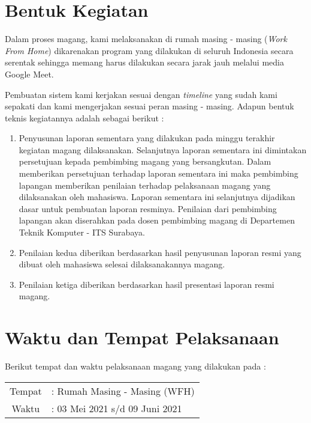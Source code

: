 \section{Bentuk Kegiatan}

Dalam proses magang, kami melaksanakan di rumah masing - masing (\textit{Work From Home}) dikarenakan program yang dilakukan di seluruh Indonesia secara serentak sehingga memang harus dilakukan secara jarak jauh melalui media Google Meet.

Pembuatan sistem kami kerjakan sesuai dengan \textit{timeline} yang sudah kami sepakati dan kami mengerjakan sesuai peran masing - masing. Adapun bentuk teknis kegiatannya adalah sebagai berikut :

\begin{enumerate}[nolistsep]
      \item Penyusunan laporan sementara yang dilakukan pada minggu terakhir kegiatan
            magang dilaksanakan. Selanjutnya laporan sementara ini dimintakan persetujuan
            kepada pembimbing magang yang bersangkutan. Dalam memberikan persetujuan
            terhadap laporan sementara ini maka pembimbing lapangan memberikan penilaian terhadap
            pelaksanaan magang yang dilaksanakan oleh mahasiswa. Laporan sementara ini
            selanjutnya dijadikan dasar untuk pembuatan laporan resminya. Penilaian dari pembimbing
            lapangan akan diserahkan pada dosen pembimbing magang di Departemen Teknik
            Komputer - ITS Surabaya.

      \item Penilaian kedua diberikan berdasarkan hasil penyusunan laporan resmi yang dibuat
            oleh mahasiswa selesai dilaksanakannya magang.

      \item Penilaian ketiga diberikan berdasarkan hasil presentasi laporan resmi magang.
\end{enumerate}

\section{Waktu dan Tempat Pelaksanaan}

Berikut tempat dan waktu pelaksanaan magang yang dilakukan pada :

\begin{tabular}{c l}
      Tempat & : Rumah Masing - Masing (WFH)  \\
      Waktu  & : 03 Mei 2021 s/d 09 Juni 2021
\end{tabular}

